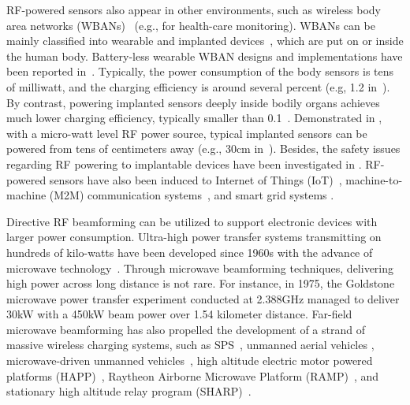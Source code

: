 \documentclass[twocolumn,10pt]{IEEEtran}
\begin{document}
RF-powered sensors also appear in other environments, such as wireless body area networks (WBANs)~\cite{H.2013Jiang,S.2015Rao} (e.g., for health-care monitoring). WBANs can be mainly classified into wearable and implanted devices~\cite{F.2010Zhang}, which are put on or inside the human body. Battery-less wearable WBAN designs and implementations have been reported in~\cite{Y.2014Toh,N.2014Desai, J.2012Olivo}.
Typically, the power consumption of the body sensors is tens of milliwatt, and the charging efficiency is around several percent (e.g, 1.2 in~\cite{N.2014Desai}). 
By contrast, powering implanted sensors deeply inside bodily organs achieves much lower charging efficiency, typically smaller than 0.1~\cite{S.2014Majerus}.   
Demonstrated in \cite{S.2014Majerus,Y.2011Chow,M.2013Arsalan}, with a micro-watt level RF power source, typical implanted sensors can be powered from tens of centimeters away (e.g., 30cm in~\cite{Y.2011Chow}). Besides, the safety issues regarding RF powering to implantable devices have been investigated in \cite{A.2013Bercich}. RF-powered sensors have also been induced to Internet of Things (IoT)~\cite{K.2012Chen,S.2014Gollakota}, machine-to-machine (M2M) communication systems~\cite{K.2012Ng}, and smart grid systems \cite{Erol-Kantarci2012Suresense,Erol-Kantarci2012DRIFT,U.2014Baroudi}. 



Directive RF beamforming can be utilized to support electronic devices with larger power consumption. Ultra-high power transfer systems transmitting on hundreds of kilo-watts have been developed since 1960s with the advance of microwave technology~\cite{K.2015Huang}. Through microwave beamforming techniques, delivering high power across long distance is not rare. For instance, in 1975, the Goldstone microwave power transfer experiment conducted at 2.388GHz managed to deliver 30kW with a 450kW beam power over 1.54 kilometer distance. Far-field microwave beamforming has also propelled the development of a strand of massive wireless charging systems, such as SPS~\cite{H.1996Nansen,E.1977Glaser,C.1992Brown}, unmanned aerial vehicles \cite{A.1996Foote,J.2006Kim}, microwave-driven unmanned vehicles~\cite{J.2013Miyasaka,J.2014Miyasaka,A.2007Oida}, high altitude 
electric motor powered platforms (HAPP)~\cite{K.1982Stefan,B.1982Ernald}, Raytheon Airborne Microwave Platform (RAMP)~\cite{B.2013Strassner},  and stationary high altitude relay program (SHARP)~\cite{J.1985Schlesak, R.1992East}. 
\end{document}

